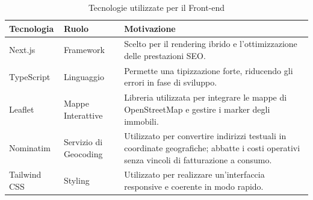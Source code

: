 \documentclass[a4paper,11pt]{article}
\renewcommand{\arraystretch}{1.18}
\begin{document}
\begin{table}[htbp]
\centering
\caption{Tecnologie utilizzate per il Front-end} %
\vspace{0.5em}
\renewcommand{\arraystretch}{1.5}
\begin{tabularx}{\textwidth}{|l|l|X|}
\hline
\rowcolor[HTML]{010066} 
{\color[HTML]{EFEFEF} \textbf{Tecnologia}} & {\color[HTML]{FFFFFF} \textbf{Ruolo}} & {\color[HTML]{FFFFFF} \textbf{Motivazione}} \\ \hline

Next.js & Framework & Scelto per il rendering ibrido e l'ottimizzazione delle prestazioni SEO. \\ \hline

TypeScript & Linguaggio & Permette una tipizzazione forte, riducendo gli errori in fase di sviluppo. \\ \hline

Leaflet & Mappe Interattive & Libreria utilizzata per integrare le mappe di OpenStreetMap e gestire i marker degli immobili. \\ \hline
Nominatim & Servizio di Geocoding & Utilizzato per convertire indirizzi testuali in coordinate geografiche; abbatte i costi operativi senza vincoli di fatturazione a consumo. \\ \hline

Tailwind CSS & Styling & Utilizzato per realizzare un'interfaccia responsive e coerente in modo rapido. \\ \hline
\end{tabularx}
\end{table}
\end{document}

